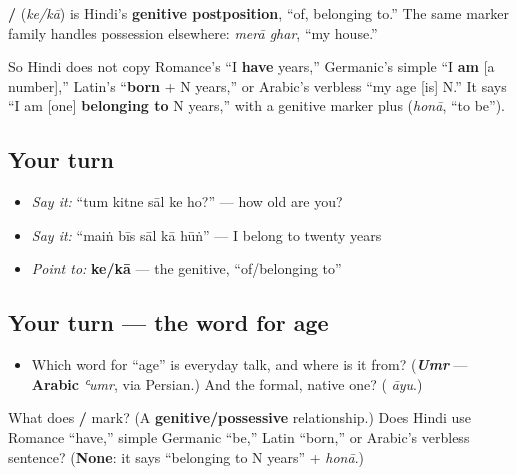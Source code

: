 \textbf{/} (\emph{ke/kā}) is Hindi's \textbf{genitive postposition}, \textquotedblleft{}of, belonging to.\textquotedblright{} The same marker family handles possession elsewhere: \emph{merā ghar}, \textquotedblleft{}my house.\textquotedblright{}

So Hindi does not copy Romance's \textquotedblleft{}I \textbf{have} years,\textquotedblright{} Germanic's simple \textquotedblleft{}I \textbf{am} {[}a number{]},\textquotedblright{} Latin's \textquotedblleft{}\textbf{born} + N years,\textquotedblright{} or Arabic's verbless \textquotedblleft{}my age {[}is{]} N.\textquotedblright{} It says \textquotedblleft{}I am {[}one{]} \textbf{belonging to} N years,\textquotedblright{} with a genitive marker plus \textbf{} (\emph{honā}, \textquotedblleft{}to be\textquotedblright{}).

\subsection*{Your turn}
\begin{itemize}
\raggedright
  \item \emph{Say it:} \textquotedblleft{}tum kitne sāl ke ho?\textquotedblright{} — how old are you?
  \item \emph{Say it:} \textquotedblleft{}maiṅ bīs sāl kā hūṅ\textquotedblright{} — I belong to twenty years
  \item \emph{Point to:} \textbf{ke/kā} — the genitive, \textquotedblleft{}of/belonging to\textquotedblright{}
\end{itemize}

\subsection*{Your turn — the word for age}
\begin{itemize}
\raggedright
  \item Which word for \textquotedblleft{}age\textquotedblright{} is everyday talk, and where is it from? (\emph{\textbf{Umr}} — \textbf{Arabic} \emph{ʿumr}, via Persian.) And the formal, native one? (\textbf{} \emph{āyu}.)
\end{itemize}

\begin{tcolorbox}[breakable,colback=teal!4,colframe=teal!35!black,title={Before you move on}]
What does \textbf{/} mark? (A \textbf{genitive/possessive} relationship.) Does Hindi use Romance \textquotedblleft{}have,\textquotedblright{} simple Germanic \textquotedblleft{}be,\textquotedblright{} Latin \textquotedblleft{}born,\textquotedblright{} or Arabic's verbless sentence? (\textbf{None}: it says \textquotedblleft{}belonging to N years\textquotedblright{} + \emph{honā}.)
\end{tcolorbox}

